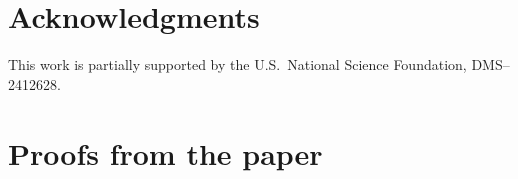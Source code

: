 \documentclass[12pt]{article}
\def\st{\mathcal{S}}
\begin{document}

\section*{Acknowledgments}

This work is partially supported by the U.S.~National Science Foundation, DMS--2412628. 


\appendix



\section{Proofs from the paper}
\label{A:properties}
\end{document}
